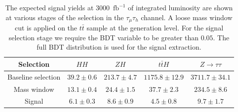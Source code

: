 \begin{table}[!ht]
\begin{center} 
\begin{tabular}{|c|c|c|c|c|}
\hline
Selection  & $HH$ & $ZH$ & $t\bar{t}H$ & $Z\rightarrow \tau\tau$  \\  \hline 
Baseline selection & $39.2\pm0.6$ & $213.7\pm4.7$ & $1175.8\pm12.9$ & $3711.7\pm34.1$  \\
Mass window  & $13.1\pm0.4$ & $24.4\pm1.5$ & $37.7\pm2.3$ & $234.5\pm8.6$  \\ 
Signal  & $6.1\pm0.3$ & $8.6\pm0.9$ & $4.5\pm0.8$ & $9.7\pm1.7$ \\ \hline
\end{tabular}

\vspace{2mm}
\caption{ The expected signal yields at $3000$~$\mathrm{fb}^{-1}$ of integrated luminosity are shown at various stages of the selection in the $\tau_{\mu}\tau_{h}$ channel. A loose mass window cut is applied on the $t\bar{t}$ sample at the generation level. For the signal selection stage we require the BDT variable to be greater than $0.05$. The full BDT distribution is used for the signal extraction.}
\label{tab:mhsig}
\end{center}
\end{table}

